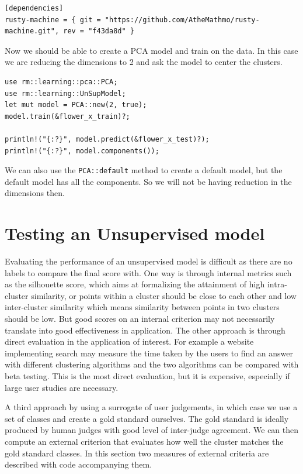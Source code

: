 \documentclass{book}
\begin{document}
\begin{lstlisting}[caption={Cargo.toml},basicstyle=\small]
[dependencies]
rusty-machine = { git = "https://github.com/AtheMathmo/rusty-machine.git", rev = "f43da8d" }
\end{lstlisting}

Now we should be able to create a PCA model and train on the data. In this case we are reducing the dimensions to 2 and ask the model to center the clusters.

\begin{lstlisting}[caption={rusty\_machine\_unsupervised},basicstyle=\small]
use rm::learning::pca::PCA;
use rm::learning::UnSupModel;
let mut model = PCA::new(2, true);
model.train(&flower_x_train)?;

println!("{:?}", model.predict(&flower_x_test)?);
println!("{:?}", model.components());
\end{lstlisting}

We can also use the \lstinline{PCA::default} method to create a default model, but the default model has all the components. So we will not be having reduction in the dimensions then.

\label{par:pca_and_rust}


\label{sec:principal_component_analysis}

\section{Testing an Unsupervised model}%
Evaluating the performance of an unsupervised model is difficult as there are no labels to compare the final score with. One way is through internal metrics such as the silhouette score, which aims at formalizing the attainment of high intra-cluster similarity, or points within a cluster should be close to each other and low inter-cluster similarity which means similarity between points in two clusters should be low. But good scores on an internal criterion may not necessarily translate into good effectiveness in application. The other approach is through direct evaluation in the application of interest. For example a website implementing search may measure the time taken by the users to find an answer with different clustering algorithms and the two algorithms can be compared with beta testing. This is the most direct evaluation, but it is expensive, especially if large user studies are necessary.

A third approach by using a surrogate of user judgements, in which case we use a set of classes and create a gold standard ourselves. The gold standard is ideally produced by human judges with good level of inter-judge agreement. We can then compute an external criterion that evaluates how well the cluster matches the gold standard classes. In this section two measures of external criteria are described with code accompanying them.
\end{document}
